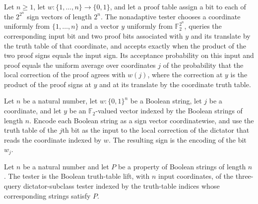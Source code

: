 \begin{theorem}
\label{FABL.coordinateConsistencyFunctionTester_acceptanceProbability}
\leanok
{}
Let $n\ge1$, let $w:\{1,\ldots,n\}\to\{0,1\}$, and let a proof table assign a bit to
each of the $2^{2^n}$ sign vectors of length $2^n$. The nonadaptive tester chooses a
coordinate uniformly from $\{1,\ldots,n\}$ and a vector $y$ uniformly from $\mathbb
F_2^{2^n}$, queries the corresponding input bit and two proof bits associated with $y$
and its translate by the truth table of that coordinate, and accepts exactly when the
product of the two proof signs equals the input sign. Its acceptance probability on this
input and proof equals the uniform average over coordinates $j$ of the probability that
the local correction of the proof agrees with $w(j)$, where the correction at $y$ is the
product of the proof signs at $y$ and at its translate by the coordinate truth table.
\end{theorem}

\begin{theorem}
\label{FABL.coordinateLocalCorrection_dictator}
\leanok
{}
Let $n$ be a natural number, let $w:\{0,1\}^n$ be a Boolean string, let $j$ be a
coordinate, and let $y$ be an $\mathbb F_2$-valued vector indexed by the Boolean
strings of length $n$. Encode each Boolean string as a sign vector coordinatewise, and
use the truth table of the $j$th bit as the input to the local correction of the
dictator that reads the coordinate indexed by $w$. The resulting sign is the encoding of
the bit $w_j$.
\end{theorem}

\begin{definition}
\label{FABL.propertyTruthTableFunctionTester}
\leanok
{}
Let $n$ be a natural number and let $P$ be a property of Boolean strings of length $n$.
The tester is the Boolean truth-table lift, with $n$ input coordinates, of the
three-query dictator-subclass tester indexed by the truth-table indices whose
corresponding strings satisfy $P$.
\end{definition}

